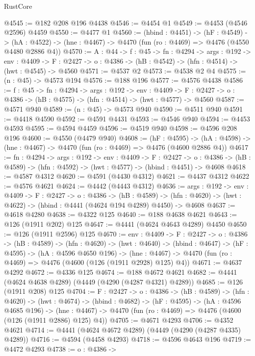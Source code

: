\begin{lexlean}{RustCore}
\begin{coremodule}
@4545 := @182 @208 @196 @4438
@4546 := @4454 @1
@4549 := @4453 (@4546 @2596) @4459
@4550 := @4477 @1
@4560 := (hbind : @4451) ->
  (hF : @4549) ->
  (hA : @4522) -> (hne : @4467) -> @4470 (fun (ro : @4469) => @4476 (@4550 @4480 @2886 @4))
@4570 := {A : @44} ->
  {f : @45} ->
  {fn : @4294} ->
  {args : @192} ->
  {env : @4409} ->
  {F : @2427} -> {o : @4386} -> (hB : @4542) -> (hfn : @4514) -> (hwt : @4545) -> @4560
@4571 := @4537 @2
@4573 := @4538 @2 @4
@4575 := (n : @45) -> @4573 @194
@4576 := @188 @196
@4577 := @4576 @4438
@4586 := {f : @45} ->
  {fn : @4294} ->
  {args : @192} ->
  {env : @4409} ->
  {F : @2427} -> {o : @4386} -> (hB : @4575) -> (hfn : @4514) -> (hwt : @4577) -> @4560
@4587 := @4571 @940
@4589 := (n : @45) -> @4573 @940
@4590 := @4511 @940
@4591 := @4418 @4590
@4592 := @4591 @4431
@4593 := @4546 @940
@4594 := @4453 @4593
@4595 := @4594 @4459
@4596 := @4519 @940
@4598 := @4596 @208 @196
@4600 := @4550 (@4479 @940)
@4608 := (hF : @4595) ->
  (hA : @4598) -> (hne : @4467) -> @4470 (fun (ro : @4469) => @4476 (@4600 @2886 @4))
@4617 := {fn : @4294} ->
  {args : @192} ->
  {env : @4409} ->
  {F : @2427} ->
  {o : @4386} -> (hB : @4589) -> (hfn : @4592) -> (hwt : @4577) -> (hbind : @4451) -> @4608
@4618 := @4587 @4312
@4620 := @4591 (@4430 @4312)
@4621 := @4437 @4312
@4622 := @4576 @4621
@4624 := @4442 (@4443 @4312)
@4636 := {args : @192} ->
  {env : @4409} ->
  {F : @2427} ->
  {o : @4386} ->
  (hB : @4589) ->
  (hfn : @4620) -> (hwt : @4622) -> (hbind : @4441 (@4624 @194 @4289) @4450) -> @4608
@4637 := @4618 @4280
@4638 := @4322 @125
@4640 := @188 @4638 @4621
@4643 := @126 (@1911 @202) @125
@4647 := @4441 (@4624 @4643 @4289) @4450
@4650 := @126 (@1911 @2596) @125
@4670 := {env : @4409} ->
  {F : @2427} ->
  {o : @4386} ->
  (hB : @4589) ->
  (hfn : @4620) ->
  (hwt : @4640) ->
  (hbind : @4647) ->
  (hF : @4595) ->
  (hA : @4596 @4650 @196) ->
  (hne : @4467) -> @4470 (fun (ro : @4469) => @4476 (@4600 (@126 (@1911 @2928) @125) @4))
@4671 := @4637 @4292
@4672 := @4336 @125
@4674 := @188 @4672 @4621
@4682 := @4441 (@4624 @4638 @4289) (@4449 (@4290 (@4287 @4321) @4289))
@4685 := @126 (@1911 @208) @125
@4704 := {F : @2427} ->
  {o : @4386} ->
  (hB : @4589) ->
  (hfn : @4620) ->
  (hwt : @4674) ->
  (hbind : @4682) ->
  (hF : @4595) ->
  (hA : @4596 @4685 @196) ->
  (hne : @4467) -> @4470 (fun (ro : @4469) => @4476 (@4600 (@126 (@1911 @2886) @125) @4))
@4705 := @4671 @4293
@4706 := @4352 @4621
@4714 := @4441 (@4624 @4672 @4289) (@4449 (@4290 (@4287 @4335) @4289))
@4716 := @4594 (@4458 @4293)
@4718 := @4596 @4643 @196
@4719 := @4472 @4293
@4738 := {o : @4386} ->

\end{coremodule}
\end{lexlean}
